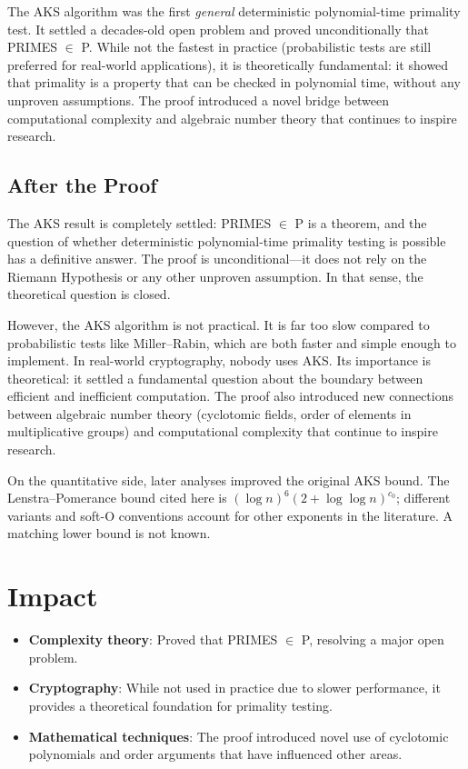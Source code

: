\begin{highlightbox}
The AKS algorithm was the first \emph{general} deterministic polynomial-time primality test. It settled a decades-old open problem and proved unconditionally that PRIMES $\in$ P. While not the fastest in practice (probabilistic tests are still preferred for real-world applications), it is theoretically fundamental: it showed that primality is a property that can be checked in polynomial time, without any unproven assumptions. The proof introduced a novel bridge between computational complexity and algebraic number theory that continues to inspire research.
\end{highlightbox}

\subsection{After the Proof}

The AKS result is completely settled: PRIMES $\in$ P is a theorem, and the question of whether deterministic polynomial-time primality testing is possible has a definitive answer. The proof is unconditional---it does not rely on the Riemann Hypothesis or any other unproven assumption. In that sense, the theoretical question is closed.

However, the AKS algorithm is not practical. It is far too slow compared to probabilistic tests like Miller--Rabin, which are both faster and simple enough to implement. In real-world cryptography, nobody uses AKS. Its importance is theoretical: it settled a fundamental question about the boundary between efficient and inefficient computation. The proof also introduced new connections between algebraic number theory (cyclotomic fields, order of elements in multiplicative groups) and computational complexity that continue to inspire research.

On the quantitative side, later analyses improved the original AKS bound. The Lenstra--Pomerance bound cited here is $(\log n)^6(2+\log\log n)^{c_0}$; different variants and soft-O conventions account for other exponents in the literature. A matching lower bound is not known.

\section{Impact}

\begin{itemize}
\item \textbf{Complexity theory}: Proved that PRIMES $\in$ P, resolving a major open problem.
\item \textbf{Cryptography}: While not used in practice due to slower performance, it provides a theoretical foundation for primality testing.
\item \textbf{Mathematical techniques}: The proof introduced novel use of cyclotomic polynomials and order arguments that have influenced other areas.
\end{itemize}

